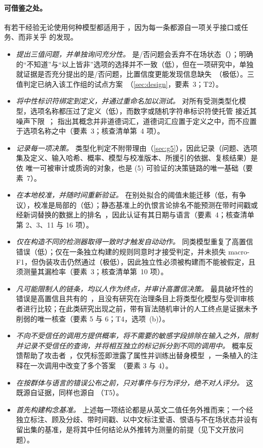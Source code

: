 \paragraph{可借鉴之处。}
有若干经验无论使用何种模型都适用于 \pol{}，因为每一条都源自一项关乎接口或任务、而非关乎 \jev{} 的发现。
\begin{itemize}
  \item \emph{提出三值问题，并单独询问充分性。} 是/否问题会丢弃不在场状态（）；明确的“不知道”与“以上皆非”选项的选择并不一致（低），但在一项研究中，单独就证据是否充分提出的是/否问题，比置信度更能发现信息缺失~\cite{arx01006}（极低）。三值判定已纳入该工作组的试点方案~\cite{polgov}（\cref{sec:design}，要素~3；T2）。
  \item \emph{将中性标识符绑定到定义，并通过重命名加以测试。} 对所有受测类型化模型，选项名称都压过了定义（低），而数字或随机字符串标识符使托管 \jev{} 接近其噪声下限~\cite{arx00346}； 指出其概念并非道德词汇，道德词汇应置于定义之中，而不应置于选项名称之中（要素~3；核查清单第~4 项）。
  \item \emph{记录每一项决策。} 类型化判定不附带理由（\cref{sec:g5}），因此记录（问题、选项集及定义、输入哈希、概率、模型与校准版本、所援引的依据、复核结果）是依  唯一可被审计或质询的对象，也是 (5) 可验证的决策链路的唯一基础（要素~7）。
  \item \emph{在本地校准，并随时间重新验证。} 在别处拟合的阈值未能迁移（低，有争议），校准是局部的（低）；静态基准上的仇恨言论排名不能预测在带时间戳或经新词替换的数据上的排名~\cite{dibonaventura2025hatevolution}，因此认证有其日期与语言（要素~4；核查清单第 2、3、11 与 16 项）。
  \item \emph{仅在构造不同的检测器取得一致时才触发自动动作。} 同类模型重复了高置信错误（低）；仅在一条独立构建的规则同意时才接受判定，并未损失 macro-F1，但伪装攻击仍然通过（极低），因此独立性必须被构建而不能被假定，且须测量其漏检率（要素~3；核查清单第~10 项）。
  \item \emph{凡可能限制人的链条，均以人作为终点，并审计高置信决策。} 最具破坏性的错误是高置信且共有的~\cite{arx29769,arx33401}，且没有研究在治理条目上将类型化模型与受训审核者进行比较；在此类研究出现之前，带有盲法随机审计的人工终点是证据未予削弱的唯一核查（要素 5 与 6；T4，选项~(b)）。
  \item \emph{不向不受信任的调用方提供概率，将不需要的敏感字段排除在输入之外，限制并记录不受信任的查询，并将相互独立的标记拆分到不同的调用中。} 概率反馈帮助了攻击者~\cite{arx30243}，仅凭标签即泄露了属性并训练出替身模型~\cite{arx04985}，一条植入的注释在一次调用中改变了多个答案~\cite{zen23038928}\zmark{}（要素 3 与 4）。
  \item \emph{在按群体与语言的错误公布之前，只对事件与行为评分，绝不对人评分。} 这既源自证据，同样也源自 （T5）。
  \item \emph{首先构建构念基准。} 上述每一项结论都是从英文二值任务外推而来；一个经独立标注、顾及分歧、带时间戳、以中文标注爱语、恨语与不在场状态并设有留出集的基准，是将其中任何结论从外推转为测量的前提（见下文开放问题）。
\end{itemize}

